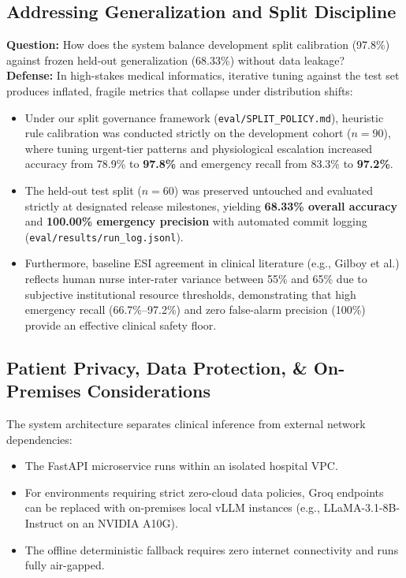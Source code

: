 \documentclass[11pt,a4paper]{article}
\begin{document}
\subsection{Addressing Generalization and Split Discipline}
\textbf{Question:} How does the system balance development split calibration (97.8\%) against frozen held-out generalization (68.33\%) without data leakage?\\
\textbf{Defense:} In high-stakes medical informatics, iterative tuning against the test set produces inflated, fragile metrics that collapse under distribution shifts:
\begin{itemize}[leftmargin=1.5em]
    \item Under our split governance framework (\texttt{eval/SPLIT\_POLICY.md}), heuristic rule calibration was conducted strictly on the development cohort ($n=90$), where tuning urgent-tier patterns and physiological escalation increased accuracy from 78.9\% to \textbf{97.8\%} and emergency recall from 83.3\% to \textbf{97.2\%}.
    \item The held-out test split ($n=60$) was preserved untouched and evaluated strictly at designated release milestones, yielding \textbf{68.33\% overall accuracy} and \textbf{100.00\% emergency precision} with automated commit logging (\texttt{eval/results/run\_log.jsonl}).
    \item Furthermore, baseline ESI agreement in clinical literature (e.g., Gilboy et al.) reflects human nurse inter-rater variance between 55\% and 65\% due to subjective institutional resource thresholds, demonstrating that high emergency recall (66.7\%--97.2\%) and zero false-alarm precision (100\%) provide an effective clinical safety floor.
\end{itemize}

\subsection{Patient Privacy, Data Protection, \& On-Premises Considerations}
The system architecture separates clinical inference from external network dependencies:
\begin{itemize}[leftmargin=1.5em]
    \item The FastAPI microservice runs within an isolated hospital VPC.
    \item For environments requiring strict zero-cloud data policies, Groq endpoints can be replaced with on-premises local vLLM instances (e.g., LLaMA-3.1-8B-Instruct on an NVIDIA A10G).
    \item The offline deterministic fallback requires zero internet connectivity and runs fully air-gapped.
\end{itemize}
\end{document}

